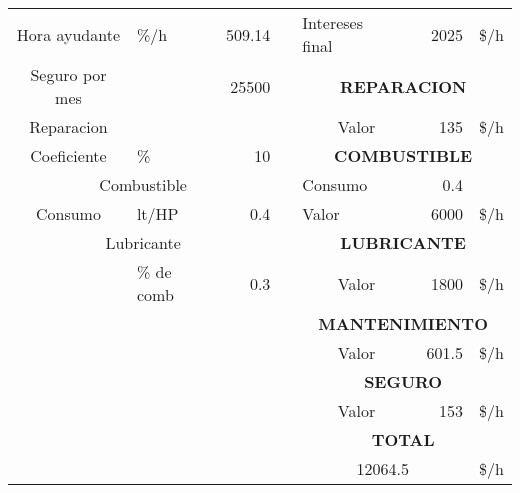 \documentclass[../main.tex]{subfiles}
\begin{document}
\begin{table}[htbp]
\begin{tabular}{rrrr|ccc|l|}
\cline{1-3}\cline{5-8}    \multicolumn{1}{|c|}{Hora ayudante} & \multicolumn{1}{l|}{\%/h} & \multicolumn{1}{r|}{509.14} &       & \multicolumn{1}{l|}{Intereses final} & \multicolumn{1}{l|}{} & \multicolumn{1}{r|}{2025} & \$/h \bigstrut\\
\cline{1-3}\cline{5-8}    \multicolumn{1}{|c|}{Seguro por mes} & \multicolumn{1}{r|}{} & \multicolumn{1}{r|}{25500} &       & \multicolumn{4}{c|}{\textbf{REPARACION}} \bigstrut\\
\cline{1-3}\cline{5-8}    \multicolumn{1}{|c|}{Reparacion} & \multicolumn{1}{r|}{} & \multicolumn{1}{r|}{} &       & \multicolumn{2}{c|}{Valor} & \multicolumn{1}{r|}{135} & \$/h \bigstrut\\
\cline{1-3}\cline{5-8}    \multicolumn{1}{|c|}{Coeficiente} & \multicolumn{1}{l|}{\%} & \multicolumn{1}{r|}{10} &       & \multicolumn{4}{c|}{\textbf{COMBUSTIBLE}} \bigstrut\\
\cline{1-3}\cline{5-8}    \multicolumn{3}{|c|}{Combustible} &       & \multicolumn{2}{l|}{Consumo} & \multicolumn{1}{r|}{0.4} &  \bigstrut\\
\cline{1-3}\cline{5-8}    \multicolumn{1}{|c|}{Consumo} & \multicolumn{1}{l|}{lt/HP} & \multicolumn{1}{r|}{0.4} &       & \multicolumn{2}{l|}{Valor} & \multicolumn{1}{r|}{6000} & \$/h \bigstrut\\
\cline{1-3}\cline{5-8}    \multicolumn{3}{|c|}{Lubricante} &       & \multicolumn{4}{c|}{\textbf{LUBRICANTE}} \bigstrut\\
\cline{1-3}\cline{5-8}    \multicolumn{1}{|r|}{} & \multicolumn{1}{l|}{\% de comb} & \multicolumn{1}{r|}{0.3} &       & \multicolumn{2}{c|}{Valor} & \multicolumn{1}{r|}{1800} & \$/h \bigstrut\\
\cline{1-3}\cline{5-8}          &       &       &       & \multicolumn{4}{c|}{\textbf{MANTENIMIENTO}} \bigstrut\\
\cline{5-8}          &       &       &       & \multicolumn{2}{c|}{Valor} & \multicolumn{1}{r|}{601.5} & \$/h \bigstrut\\
\cline{5-8}          &       &       &       & \multicolumn{4}{c|}{\textbf{SEGURO}} \bigstrut\\
\cline{5-8}          &       &       &       & \multicolumn{2}{c|}{Valor} & \multicolumn{1}{r|}{153} & \$/h \bigstrut\\
\cline{5-8}          &       &       &       & \multicolumn{4}{c|}{\textbf{TOTAL}} \bigstrut\\
\cline{5-8}          &       &       &       & \multicolumn{3}{c|}{12064.5} & \$/h \bigstrut\\
\cline{5-8}    \end{tabular}%
  \label{tab:addlabel}%
\end{table}%
\end{document}
